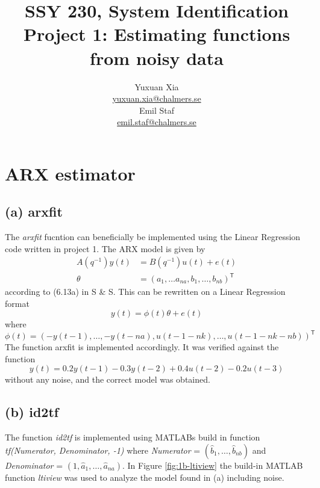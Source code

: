 \documentclass[]{article}
\title{SSY 230, System Identification\\
	Project 1: Estimating functions from noisy data}
\author{Yuxuan Xia\\ \href{mailto:yuxuan.xia@chalmers.se}{yuxuan.xia@chalmers.se}\\Emil Staf\\\href{mailto:emil.staf@chalmers.se}{emil.staf@chalmers.se}}
\begin{document}
\maketitle

\section{ARX estimator}
\subsection{(a) arxfit}
The \emph{arxfit} fucntion can beneficially be implemented using the Linear Regression code written in project 1. The ARX model is given by
\begin{align}
	\label{eq:ARX}
	A(q^{-1})y(t) &= B(q^{-1})u(t) + e(t) \\
	\theta &= (a_1, \ldots a_{na}, b_1, \ldots, b_{nb})^\mathsf{T}
\end{align}
according to (6.13a) in S \& S. This can be rewritten on a Linear Regression format
\begin{equation}
	\label{eq:ARX_LR}
	y(t) = \phi(t) \theta + e(t)
\end{equation}
where
\begin{equation}
	\label{eq:ARX_LR_phi}
	\phi(t) = (-y(t-1), \ldots, -y(t-na), u(t-1-nk), \ldots, u(t-1-nk-nb))^\mathsf{T}
\end{equation}
The function arxfit is implemented accordingly. It was verified against the function 
\begin{equation}
	\label{eq:system}
	y(t) = 0.2y(t-1) - 0.3y(t-2) + 0.4u(t-2) - 0.2u(t-3)
\end{equation}
without any noise, and the correct model was obtained.

\subsection{(b) id2tf}
The function \emph{id2tf} is implemented using MATLABs build in function \emph{tf(Numerator, Denominator, -1)} where \emph{Numerator} = $(\hat{b}_1, \ldots, \hat{b}_{nb})$ and \emph{Denominator} = $(1, \hat{a}_1, \ldots, \hat{a}_{na})$. In Figure \ref{fig:1b-ltiview} the build-in MATLAB function \emph{ltiview} was used to analyze the model found in (a) including noise.
\end{document}
